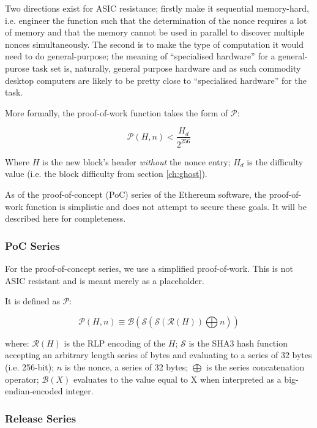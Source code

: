 \documentclass[9pt,oneside]{amsart}
\begin{document}
\begin{multicols}{2}
Two directions exist for ASIC resistance; firstly make it sequential memory-hard, i.e. engineer the function such that the determination of the nonce requires a lot of memory and that the memory cannot be used in parallel to discover multiple nonces simultaneously. The second is to make the type of computation it would need to do general-purpose; the meaning of ``specialised hardware''  for a general-purose task set is, naturally, general purpose hardware and as such commodity desktop computers are likely to be pretty close to ``specialised hardware'' for the task. 

More formally, the proof-of-work function takes the form of $\mathcal{P}$:

\begin{equation}
\mathcal{P}(H, n) < \frac{H_d}{2^{256}}
\end{equation}

Where $H$ is the new block's header \textit{without} the nonce entry; $H_d$ is the difficulty value (i.e. the block difficulty from section \ref{ch:ghost}).

As of the proof-of-concept (PoC) series of the Ethereum software, the proof-of-work function is simplistic and does not attempt to secure these goals. It will be described here for completeness.

\subsubsection{PoC Series}

For the proof-of-concept series, we use a simplified proof-of-work. This is not ASIC resistant and is meant merely as a placeholder.

It is defined as $\mathcal{P}$:

\begin{equation}
\mathcal{P}(H, n) \equiv \mathcal{B}(\mathcal{S}(\mathcal{S}(\mathcal{R}(H)) \bigoplus n))
\end{equation}

where:
$\mathcal{R}(H)$ is the RLP encoding of the $H$;
$\mathcal{S}$ is the SHA3 hash function accepting an arbitrary length series of bytes and evaluating to a series of 32 bytes (i.e. 256-bit);
$n$ is the nonce, a series of 32 bytes;
$\bigoplus$ is the series concatenation operator;
$\mathcal{B}(X)$ evaluates to the value equal to X when interpreted as a big-endian-encoded integer.

\subsubsection{Release Series}


\end{multicols}
\end{document}

